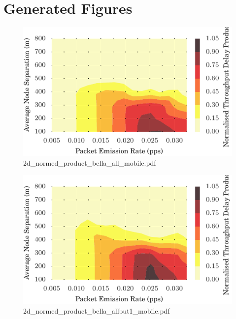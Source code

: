 \documentclass{article}
\begin{document}
\section{Generated Figures}


\begin{figure}[h!]
\centering
\includegraphics[width=\linewidth]{2d_normed_product_bella_all_mobile.pdf}
\caption{2d\_normed\_product\_bella\_all\_mobile.pdf}
\end{figure}




\begin{figure}[h!]
\centering
\includegraphics[width=\linewidth]{2d_normed_product_bella_allbut1_mobile.pdf}
\caption{2d\_normed\_product\_bella\_allbut1\_mobile.pdf}
\end{figure}
\end{document}
